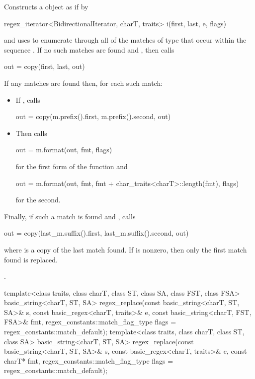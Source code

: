 \begin{itemdescr}
\pnum
{}%
%
\effects
Constructs a  object 
as if by
\begin{codeblock}
regex_iterator<BidirectionalIterator, charT, traits> i(first, last, e, flags)
\end{codeblock}
and uses  to enumerate through all
of the matches  of type 
that occur within the sequence .
If no such
matches are found and
, then calls
\begin{codeblock}
out = copy(first, last, out)
\end{codeblock}
If any matches are found then, for each such match:
\begin{itemize}
\item
If , calls
\begin{codeblock}
out = copy(m.prefix().first, m.prefix().second, out)
\end{codeblock}
\item
Then calls
\begin{codeblock}
out = m.format(out, fmt, flags)
\end{codeblock}
for the first form of the function and
\begin{codeblock}
out = m.format(out, fmt, fmt + char_traits<charT>::length(fmt), flags)
\end{codeblock}
for the second.
\end{itemize}
Finally, if such a match
is found and ,
calls
\begin{codeblock}
out = copy(last_m.suffix().first, last_m.suffix().second, out)
\end{codeblock}
where  is a copy of the last match
found. If 
is nonzero, then only the first match found is replaced.

\pnum
\returns
{}.
\end{itemdescr}

%
\begin{itemdecl}
template<class traits, class charT, class ST, class SA, class FST, class FSA>
  basic_string<charT, ST, SA>
    regex_replace(const basic_string<charT, ST, SA>& s,
                  const basic_regex<charT, traits>& e,
                  const basic_string<charT, FST, FSA>& fmt,
                  regex_constants::match_flag_type flags = regex_constants::match_default);
template<class traits, class charT, class ST, class SA>
  basic_string<charT, ST, SA>
    regex_replace(const basic_string<charT, ST, SA>& s,
                  const basic_regex<charT, traits>& e,
                  const charT* fmt,
                  regex_constants::match_flag_type flags = regex_constants::match_default);
\end{itemdecl}

